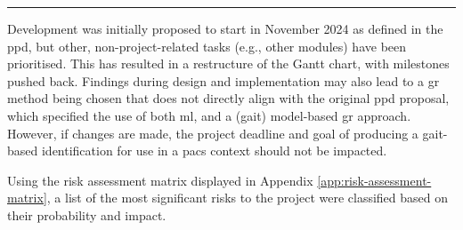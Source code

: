 \begin{landscape}
\begin{minipage}{\linewidth}
\begin{ganttchart}
        \end{ganttchart}

        \rule{\linewidth}{0.5pt} %

        \label{fig:gantt-chart}
    \end{minipage}
    \vspace*{\fill}
\end{landscape}

Development was initially proposed to start in November 2024 as defined in the \ac{ppd}, but other, non-project-related tasks (e.g., other modules) have been prioritised.
This has resulted in a restructure of the Gantt chart, with milestones pushed back.
Findings during design and implementation may also lead to a \ac{gr} method being chosen that does not directly align with the original \ac{ppd} proposal, which specified the use of both \ac{ml}, and a (gait) model-based \ac{gr} approach.
However, if changes are made, the project deadline and goal of producing a gait-based identification for use in a \ac{pacs} context should not be impacted.

Using the risk assessment matrix displayed in Appendix \ref{app:risk-assessment-matrix}, a list of the most significant risks to the project were classified based on their probability and impact.


